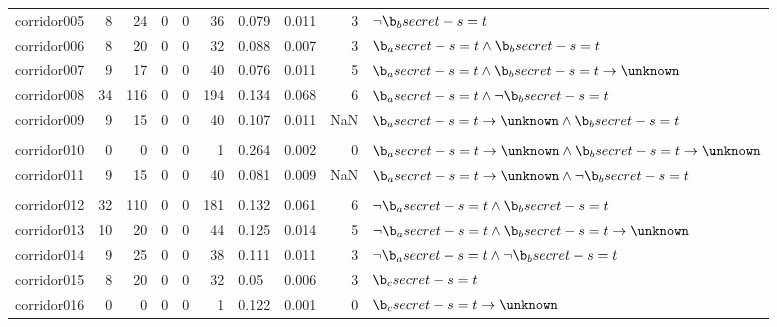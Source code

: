 \begin{tabular}{lrrrrrllrl}
corridor005 & 8 & 24 & 0 & 0 & 36 & 0.079 & 0.011 & 3 & $\neg \b_b secret-s=t $ \\%
corridor006 & 8 & 20 & 0 & 0 & 32 & 0.088 & 0.007 & 3 & $\b_a secret-s=t \land \b_b secret-s=t $ \\%
corridor007 & 9 & 17 & 0 & 0 & 40 & 0.076 & 0.011 & 5 & $\b_a secret-s=t \land \b_b secret-s=t  \rightarrow \unknown $ \\%
corridor008 & 34 & 116 & 0 & 0 & 194 & 0.134 & 0.068 & 6 & $\b_a secret-s=t \land \neg \b_b secret-s=t $ \\%
corridor009 & 9 & 15 & 0 & 0 & 40 & 0.107 & 0.011 & NaN & $\b_a secret-s=t  \rightarrow \unknown \land \b_b secret-s=t $ \\ \\
corridor010 & 0 & 0 & 0 & 0 & 1 & 0.264 & 0.002 & 0 & $\b_a secret-s=t  \rightarrow \unknown \land \b_b secret-s=t  \rightarrow \unknown $ \\%
corridor011 & 9 & 15 & 0 & 0 & 40 & 0.081 & 0.009 & NaN & $\b_a secret-s=t  \rightarrow \unknown \land \neg \b_b secret-s=t $ \\ \\
corridor012 & 32 & 110 & 0 & 0 & 181 & 0.132 & 0.061 & 6 & $\neg \b_a secret-s=t \land \b_b secret-s=t $ \\%
corridor013 & 10 & 20 & 0 & 0 & 44 & 0.125 & 0.014 & 5 & $\neg \b_a secret-s=t \land \b_b secret-s=t  \rightarrow \unknown $ \\%
corridor014 & 9 & 25 & 0 & 0 & 38 & 0.111 & 0.011 & 3 & $\neg \b_a secret-s=t \land \neg \b_b secret-s=t $ \\%
corridor015 & 8 & 20 & 0 & 0 & 32 & 0.05 & 0.006 & 3 & $\b_c secret-s=t $ \\%
corridor016 & 0 & 0 & 0 & 0 & 1 & 0.122 & 0.001 & 0 & $\b_c secret-s=t  \rightarrow \unknown $ \\%

\end{tabular}

